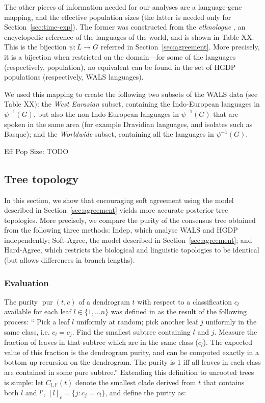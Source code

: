 \documentclass {article}
\newcommand\eqclass[2]{[#1]_{#2}}
\DeclareMathOperator{\purity}{pur}
\newcommand\lgmap{\psi}
\newcommand\softagree{{\sc Soft-Agree}}
\newcommand\hardagree{{\sc Hard-Agree}}
\newcommand\indep{{\sc Indep}}
\begin{document}
The other pieces of information needed for our analyses are a language-gene mapping, and the effective population sizes (the latter is needed only for Section~\ref{sec:time-exp}).  The former was constructed from the \emph{ethnologue} \cite{xx}, an encyclopedic reference of the languages of the world, and is shown in Table XX.  This is the bijection $\lgmap : L \to G$ referred in Section~\ref{sec:agreement}.  More precisely, it is a bijection when restricted on the domain---for some of the languages (respectively, population), no equivalent can be found in the set of HGDP populations (respectively, WALS languages).

We used this mapping to create the following two subsets of the WALS data (see Table XX): the \emph{West Eurasian} subset,  containing the Indo-European languages in $\lgmap^{-1}(G)$, but also the non Indo-European languages in $\lgmap^{-1}(G)$ that are spoken in the same area (for example Dravidian languages, and isolates such as Basque); and the \emph{Worldwide} subset, containing all the languages in $\lgmap^{-1}(G)$.

Eff Pop Size: TODO

\subsection{Tree topology}\label{sec:topo-exp}

In this section, we show that encouraging soft agreement using the model described in Section~\ref{sec:agreement} yields more accurate posterior tree topologies.  More precisely, we compare the purity of the consensus tree obtained from the following three methods: \indep, which analyse WALS and HGDP independently; \softagree, the model described in Section~\ref{sec:agreement}; and \hardagree, which restricts the biological and linguistic topologies to be identical (but allows differences in branch lengths).

\subsubsection*{Evaluation}

The purity $\purity(t,c)$ of a dendrogram $t$ with respect to a classification $c_l$ available for each leaf $l\in\{1,\dots n\}$ was defined in \cite{xx} as the result of the following process: `` 
Pick 
a leaf $l$ uniformly at random; pick another leaf $j$ uniformly in 
the same class, i.e. $c_l = c_j$. Find the smallest subtree containing 
$l$ and $j$. Measure the fraction of leaves in that subtree which are 
in the same class ($c_l$). The expected value of this fraction is the 
dendrogram purity, and can be computed exactly in a bottom 
up recursion on the dendrogram. The purity is 1 iff all leaves in 
each class are contained in some pure subtree.''
Extending this definition to unrooted trees is simple: let $C_{l,l'}(t)$ denote the smallest clade derived from $t$ that contains both $l$ and $l'$, $\eqclass{l}{c} = \{j : c_j = c_l\}$, and define the purity as:
\end{document}

